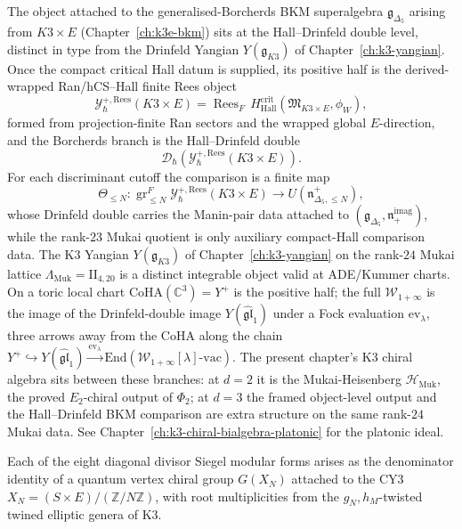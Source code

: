 \begin{remark}
\label{rem:k3ca-hall-drinfeld-scope}
The object attached to the generalised-Borcherds BKM superalgebra
$\mathfrak{g}_{\Delta_5}$ arising from $K3\times E$
(Chapter~\ref{ch:k3e-bkm}) sits at the Hall--Drinfeld double level,
distinct in type from the Drinfeld Yangian
$Y(\mathfrak{g}_{K3})$ of Chapter~\ref{ch:k3-yangian}. Once the compact
critical Hall datum is supplied, its positive half is the
derived-wrapped Ran/hCS--Hall finite Rees object
\[
\mathcal Y^{+,\mathrm{Rees}}_{\hbar}(K3\times E)
=
\operatorname{Rees}_{F}\,
H^{\mathrm{crit}}_{\mathrm{Hall}}(\mathfrak M_{K3\times E},\phi_W),
\]
formed from projection-finite Ran sectors and the wrapped global
\(E\)-direction, and the Borcherds branch is the Hall--Drinfeld double
\[
\mathcal D_\hbar\!\left(
\mathcal Y^{+,\mathrm{Rees}}_{\hbar}(K3\times E)\right).
\]
For each discriminant cutoff the comparison is a finite map
\[
\Theta_{\leq N}\colon
\operatorname{gr}^{F}_{\leq N}
\mathcal Y^{+,\mathrm{Rees}}_{\hbar}(K3\times E)
\longrightarrow
U(\mathfrak n^{+}_{\Delta_5,\leq N}),
\]
whose Drinfeld double carries the Manin-pair data attached to
\((\mathfrak{g}_{\Delta_5},
\mathfrak n_+^{\mathrm{imag}})\), while the rank-$23$ Mukai quotient is
only auxiliary compact-Hall comparison data.  The K3 Yangian
$Y(\mathfrak{g}_{K3})$ of Chapter~\ref{ch:k3-yangian} on the rank-$24$
Mukai lattice $\Lambda_{\mathrm{Muk}}=\mathrm{II}_{4,20}$ is a distinct
integrable object valid at ADE/Kummer charts.  On a toric local chart
\(\mathrm{CoHA}(\mathbb C^3)=Y^+\) is the positive half; the full
\(\mathcal W_{1+\infty}\) is the image of the Drinfeld-double image
$Y(\widehat{\mathfrak{gl}}_1)$ under a Fock evaluation
$\mathrm{ev}_\lambda$, three arrows away from the CoHA along the chain
$Y^+ \hookrightarrow Y(\widehat{\mathfrak{gl}}_1) \xrightarrow{\mathrm{ev}_\lambda}
\mathrm{End}(\mathcal W_{1+\infty}[\lambda]\text{-vac})$. The
present chapter's K3 chiral algebra sits between these branches: at
$d=2$ it is the Mukai-Heisenberg $\mathcal{H}_{\mathrm{Muk}}$, the
proved $E_2$-chiral output of $\Phi_2$; at $d=3$ the framed object-level
output and the Hall--Drinfeld BKM comparison are extra structure on the
same rank-$24$ Mukai data.  See
Chapter~\ref{ch:k3-chiral-bialgebra-platonic} for the platonic ideal.
\end{remark}

\begin{conjecture}
\label{conj:eight-qvcg}
Each of the eight diagonal divisor Siegel modular forms arises as the denominator identity of a quantum vertex chiral group $G(X_N)$ attached to the CY3 $X_N = (S \times E)/(\mathbb{Z}/N\mathbb{Z})$, with root multiplicities from the $g_N, h_M$-twisted twined elliptic genera of K3.
\end{conjecture}

